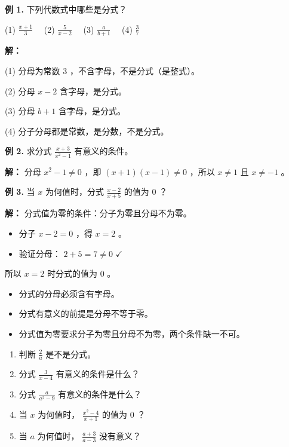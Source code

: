 \begin{workedexamples}


\textbf{例 1.} 下列代数式中哪些是分式？

(1) $\frac{x+1}{3}$ 　(2) $\frac{5}{x-2}$ 　(3) $\frac{a}{b+1}$ 　(4) $\frac{3}{7}$

\textbf{解：}

(1) 分母为常数 $3$ ，不含字母，不是分式（是整式）。

(2) 分母 $x - 2$ 含字母，是分式。

(3) 分母 $b + 1$ 含字母，是分式。

(4) 分子分母都是常数，是分数，不是分式。

\textbf{例 2.} 求分式 $\frac{x+3}{x^2-1}$ 有意义的条件。

\textbf{解：} 分母 $x^2 - 1 \neq 0$ ，即 $(x+1)(x-1) \neq 0$ ，所以 $x \neq 1$ 且 $x \neq -1$ 。

\textbf{例 3.} 当 $x$ 为何值时，分式 $\frac{x-2}{x+5}$ 的值为 $0$ ？

\textbf{解：} 分式值为零的条件：分子为零且分母不为零。

\begin{itemize}
  \item 分子 $x - 2 = 0$ ，得 $x = 2$ 。
  \item 验证分母： $2 + 5 = 7 \neq 0$ $\checkmark$
\end{itemize}


所以 $x = 2$ 时分式的值为 $0$ 。

\end{workedexamples}

\begin{keytakeaway}


\begin{itemize}
  \item 分式的分母必须含有字母。
  \item 分式有意义的前提是分母不等于零。
  \item 分式值为零要求分子为零且分母不为零，两个条件缺一不可。
\end{itemize}


\end{keytakeaway}

\begin{practice}


\begin{enumerate}
  \item 判断 $\frac{2}{a}$ 是不是分式。
  \item 分式 $\frac{3}{x-4}$ 有意义的条件是什么？
  \item 分式 $\frac{a}{a^2 - 9}$ 有意义的条件是什么？
  \item 当 $x$ 为何值时， $\frac{x^2 - 4}{x + 1}$ 的值为 $0$ ？
  \item 当 $a$ 为何值时， $\frac{a + 3}{a - 3}$ 没有意义？
\end{enumerate}


\end{practice}

